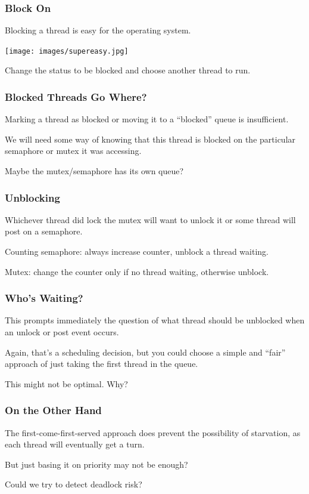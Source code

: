 \begin{frame}
\frametitle{Block On}

Blocking a thread is easy for the operating system.

\begin{center}
	\texttt{[image: images/supereasy.jpg]}
\end{center}

Change the status to be blocked and choose another thread to run.

\end{frame}

\begin{frame}
\frametitle{Blocked Threads Go Where?}

Marking a thread as blocked or moving it to a ``blocked'' queue is insufficient.

We will need some way of knowing that this thread is blocked on the particular semaphore or mutex it was accessing.

Maybe the mutex/semaphore has its own queue?

\end{frame}

\begin{frame}
\frametitle{Unblocking}

Whichever thread did lock the mutex will want to unlock it or some thread will post on a semaphore.

Counting semaphore: always increase counter, unblock a thread waiting.

Mutex: change the counter only if no thread waiting, otherwise unblock.

\end{frame}

\begin{frame}
\frametitle{Who's Waiting?}

This prompts immediately the question of what thread should be unblocked when an unlock or post event occurs. 

Again, that's a scheduling decision, but you could choose a simple and ``fair'' approach of just taking the first thread in the queue. 

This might not be optimal. Why?

\end{frame}

\begin{frame}
\frametitle{On the Other Hand}

The first-come-first-served approach does prevent the possibility of starvation, as each thread will eventually get a turn.

But just basing it on priority may not be enough?

Could we try to detect deadlock risk?

\end{frame}


